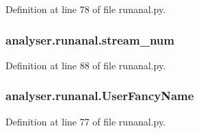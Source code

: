 Definition at line 78 of file runanal.\-py.

\hypertarget{namespaceanalyser_1_1runanal_a9ab10ca739edd64bcf02f5ae3a25fb24}{
\subsubsection[{stream\-\_\-num}]{\setlength{\rightskip}{0pt plus 5cm}analyser.\-runanal.\-stream\-\_\-num}}\label{namespaceanalyser_1_1runanal_a9ab10ca739edd64bcf02f5ae3a25fb24}


Definition at line 88 of file runanal.\-py.

\hypertarget{namespaceanalyser_1_1runanal_a8a90baaed28192ee2dafa5a4843ae9ba}{
\subsubsection[{User\-Fancy\-Name}]{\setlength{\rightskip}{0pt plus 5cm}analyser.\-runanal.\-User\-Fancy\-Name}}\label{namespaceanalyser_1_1runanal_a8a90baaed28192ee2dafa5a4843ae9ba}


Definition at line 77 of file runanal.\-py.

